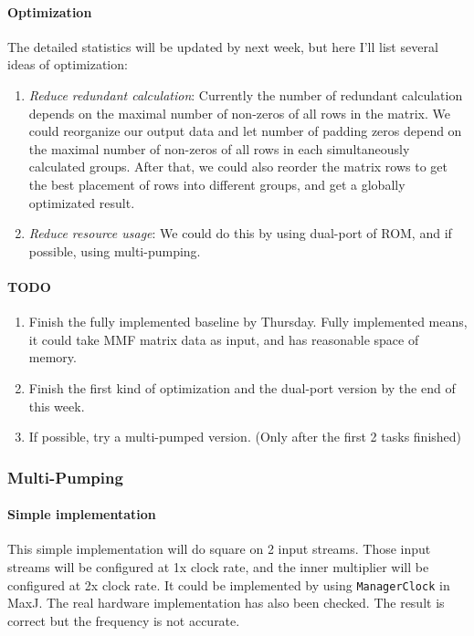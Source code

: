 \paragraph{Optimization} The detailed statistics will be updated by next week, but here I'll list several ideas of optimization:
\begin{enumerate}
\item \textit{Reduce redundant calculation}: Currently the number of redundant calculation depends on the maximal number of non-zeros of all rows in the matrix. We could reorganize our output data and let number of padding zeros depend on the maximal number of non-zeros of all rows in each simultaneously calculated groups. After that, we could also reorder the matrix rows to get the best placement of rows into different groups, and get a globally optimizated result.
\item \textit{Reduce resource usage}: We could do this by using dual-port of ROM, and if possible, using multi-pumping.
\end{enumerate}

\paragraph{TODO} 
\begin{enumerate}
\item Finish the fully implemented baseline by Thursday. Fully implemented means, it could take MMF matrix data as input, and has reasonable space of memory.
\item Finish the first kind of optimization and the dual-port version by the end of this week.
\item If possible, try a multi-pumped version. (Only after the first 2 tasks finished)
\end{enumerate}

\subsubsection{Multi-Pumping}

\paragraph{Simple implementation} This simple implementation will do square on 2 input streams. Those input streams will be configured at 1x clock rate, and the inner multiplier will be configured at 2x clock rate. It could be implemented by using \texttt{ManagerClock} in MaxJ. The real hardware implementation has also been checked. The result is correct but the frequency is not accurate.

